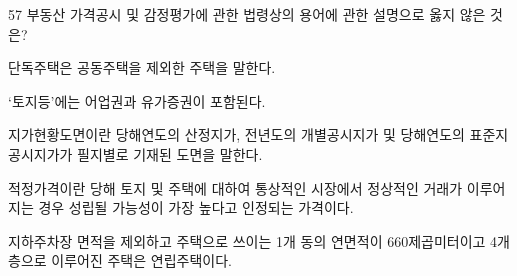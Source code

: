 \begin{question}{57}
부동산 가격공시 및 감정평가에 관한 법령상의 용어에 관한 설명으로 옳지 않은 것은?
\begin{choices}
  \item 단독주택은 공동주택을 제외한 주택을 말한다.
  \item ‘토지등’에는 어업권과 유가증권이 포함된다.
  \item 지가현황도면이란 당해연도의 산정지가, 전년도의 개별공시지가 및 당해연도의 표준지공시지가가 필지별로 기재된 도면을 말한다.
  \item 적정가격이란 당해 토지 및 주택에 대하여 통상적인 시장에서 정상적인 거래가 이루어지는 경우 성립될 가능성이 가장 높다고 인정되는 가격이다.
  \item 지하주차장 면적을 제외하고 주택으로 쓰이는 1개 동의 연면적이 660제곱미터이고 4개층으로 이루어진 주택은 연립주택이다.
\end{choices}
\end{question}

